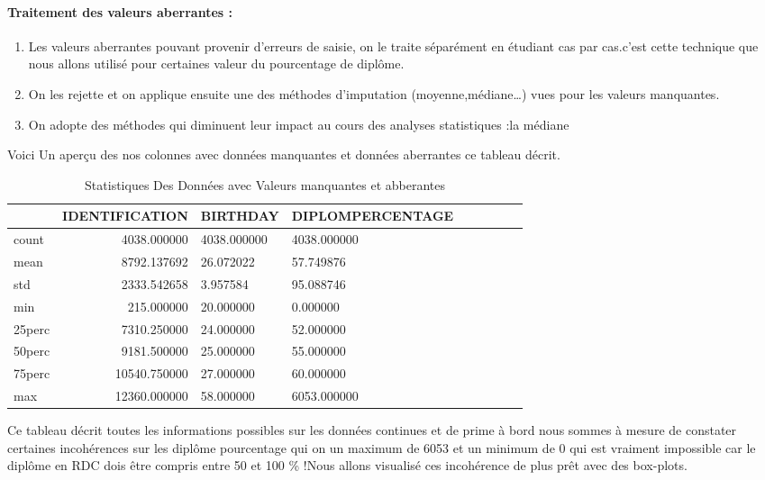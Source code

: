 \paragraph{Traitement des valeurs aberrantes :}
\begin{enumerate}
	\item  Les valeurs aberrantes pouvant provenir d'erreurs de saisie, on le traite séparément
	en étudiant cas par cas.c'est cette technique que nous allons utilisé
	pour certaines valeur du pourcentage de diplôme.
	\item On les rejette et on applique ensuite une des méthodes d’imputation (moyenne,médiane…) vues pour les valeurs manquantes.
	\item  On adopte des méthodes qui diminuent leur impact au cours des analyses statistiques :la médiane
\end{enumerate}
Voici Un aperçu des nos colonnes avec données manquantes et données aberrantes
ce tableau décrit.
\begin{table}
\centering
\begingroup %
\captionsetup{type=table} %
\caption{Statistiques Des Données avec Valeurs manquantes et abberantes}
\label{tab:MisisnV}
\begin{tabular}{lrlllllll}
	\toprule
	{}& IDENTIFICATION   &  BIRTHDAY &  DIPLOMPERCENTAGE \\
	\midrule  
count  &   4038.000000 & 4038.000000      & 4038.000000\\
mean   &   8792.137692  &   26.072022       &  57.749876 \\
std   &    2333.542658   &  3.957584     &    95.088746\\
min   &     215.000000    &20.000000     &     0.000000\\
25perc  &     7310.250000 &   24.000000     &    52.000000\\
50perc   &   9181.500000  & 25.000000      &   55.000000\\
75perc  &   10540.750000   & 27.000000     &    60.000000 \\
max  &    12360.000000  &  58.000000      & 6053.000000\\
\bottomrule
\end{tabular}
\endgroup
\end{table}

Ce tableau décrit toutes les informations possibles sur les données
continues et de prime à bord nous sommes à mesure de constater certaines
incohérences sur les diplôme pourcentage qui on un maximum de 6053 et un
minimum de 0 qui est vraiment impossible car le diplôme en RDC dois être
compris entre 50 et 100 \% !Nous allons visualisé ces incohérence de
plus prêt avec des box-plots.

